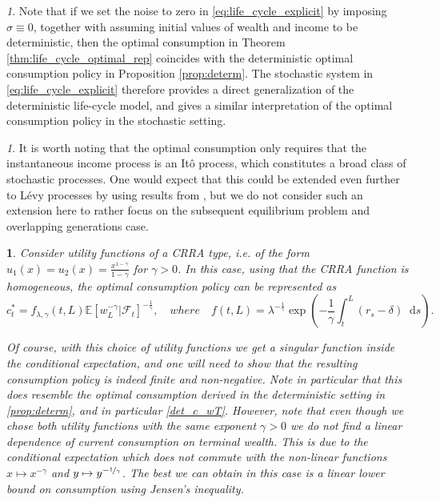 \documentclass[11pt,oneside,english,reqno,dvipsnames,table]{amsart}
\numberwithin{equation}{section}
\theoremstyle{plain}
\theoremstyle{definition}
\theoremstyle{remark}
\newtheorem{rem}[thm]{\protect\remarkname}
\theoremstyle{plain}
\theoremstyle{plain}
\theoremstyle{plain}
\theoremstyle{plain}
\theoremstyle{plain}
\newtheorem{ex}[thm]{\protect\examplename}
\theoremstyle{plain}
\theoremstyle{plain}
\providecommand{\remarkname}{Remark}
\providecommand{\examplename}{Example}
\providecommand{\remarkname}{Remark}
\newcommand{\cF}{\mathcal{F}}
\newcommand{\EE}{\mathbb{E}}
\newcommand{\dd}{\mathop{}\!\mathrm{d}}
\numberwithin{thm}{section}
\begin{document}
\begin{rem}
   Note that if we set the noise to zero in \eqref{eq:life_cycle_explicit} by imposing $\sigma \equiv 0$, together with assuming initial values of wealth and income to be deterministic, then the optimal consumption in Theorem \ref{thm:life_cycle_optimal_rep} coincides with the deterministic optimal consumption policy in Proposition \ref{prop:determ}. The stochastic system in \eqref{eq:life_cycle_explicit} therefore provides a direct generalization of the deterministic life-cycle model, and gives a similar interpretation of the optimal consumption policy in the stochastic setting.
\end{rem}
%
\begin{rem}
    It is worth noting that the optimal consumption only requires that the instantaneous income process is an It\^o process, which constitutes a broad class of stochastic processes. One would expect that this could be extended even further to L\'evy processes by using results from \cite{oksendal2007applied}, but we do not consider such an extension here  to rather focus on the subsequent equilibrium problem and overlapping generations case.  
\end{rem}
%
\begin{ex}
Consider utility functions of a CRRA type, i.e. of the form $u_1(x)=u_2(x)=\frac{x^{1-\gamma}
}{1-\gamma}$ for $\gamma >0$. In this case, using that the CRRA function is homogeneous, the optimal consumption policy can be represented as 
%
\begin{equation}\label{eq:consumption_CRRA}
  c^*_t = f_{\lambda,\gamma}(t,L)\EE[w_L^{-\gamma}|\cF_t]^{-\frac{1}{\gamma}},\quad where \quad f(t,L)=\lambda^{-\frac{1}{\gamma}}\exp\left(-\frac{1}{\gamma}\int_t^L (r_s-\delta) \dd s\right).  
\end{equation}


Of course, with this choice of utility functions we get a singular function inside the conditional expectation, and one will need to show that the resulting consumption policy is indeed finite and non-negative. 
Note in particular that  this does resemble the optimal consumption derived in the deterministic setting in \ref{prop:determ}, and in particular \eqref{det_c_wT}. However, 
note that even though we chose both utility functions with the same exponent $\gamma>0$ we do not find a linear dependence of current consumption on terminal wealth. This is due to the conditional expectation which does not commute with the non-linear functions $x\mapsto x^{-\gamma}$ and $y\mapsto y^{-\nicefrac{1}{\gamma}}$. The best we can obtain in this case is a linear lower bound on consumption using Jensen's inequality.
\end{ex}
\end{document}
